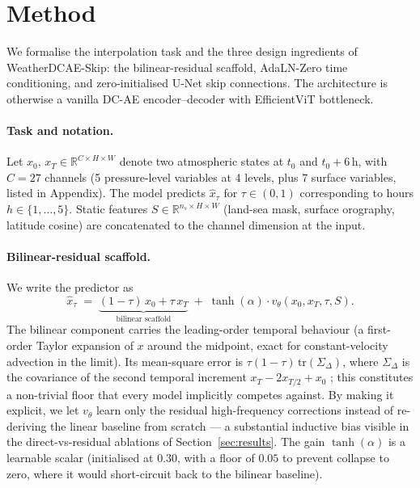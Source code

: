 \documentclass[10pt,letterpaper,twocolumn]{article}
\begin{document}
\section{Method}
\label{sec:method}

We formalise the interpolation task and the three design ingredients of
WeatherDCAE-Skip: the bilinear-residual scaffold, AdaLN-Zero time conditioning,
and zero-initialised U-Net skip connections. The architecture is
otherwise a vanilla DC-AE \cite{xie2024dcae} encoder--decoder with
EfficientViT \cite{xie2024dcae} bottleneck.

\paragraph{Task and notation.}
Let $x_0,\,x_T\in\mathbb{R}^{C\times H\times W}$ denote two atmospheric
states at $t_0$ and $t_0{+}6\,$h, with $C{=}27$ channels (5
pressure-level variables at 4 levels, plus 7 surface variables, listed in
Appendix). The model predicts $\hat x_\tau$ for $\tau\in(0,1)$ corresponding
to hours $h\in\{1,\ldots,5\}$. Static features
$S\in\mathbb{R}^{n_s\times H\times W}$ (land-sea mask, surface orography,
latitude cosine) are concatenated to the channel dimension at the input.

\paragraph{Bilinear-residual scaffold.}
We write the predictor as
\begin{equation}
\hat{x}_\tau \;=\; \underbrace{(1{-}\tau)\,x_0 + \tau\,x_T}_{\text{bilinear scaffold}}
   \;+\; \tanh(\alpha)\cdot v_\theta(x_0, x_T, \tau, S).
\label{eq:scaffold}
\end{equation}
The bilinear component carries the leading-order temporal behaviour
(a first-order Taylor expansion of $x$ around the midpoint, exact for
constant-velocity advection in the limit). Its mean-square error is
$\tau(1{-}\tau)\,\mathrm{tr}(\Sigma_\Delta)$, where $\Sigma_\Delta$ is
the covariance of the second temporal increment
$x_T{-}2x_{T/2}{+}x_0$ \cite{karatzas1991brownian}; this constitutes a
non-trivial floor that every model implicitly competes against. By
making it explicit, we let $v_\theta$ learn only the residual high-frequency
corrections instead of re-deriving the linear baseline from scratch ---
a substantial inductive bias visible in the
direct-vs-residual ablations of Section~\ref{sec:results}. The gain
$\tanh(\alpha)$ is a learnable scalar (initialised at $0.30$, with a
floor of $0.05$ to prevent collapse to zero, where it would short-circuit
back to the bilinear baseline).
\end{document}
